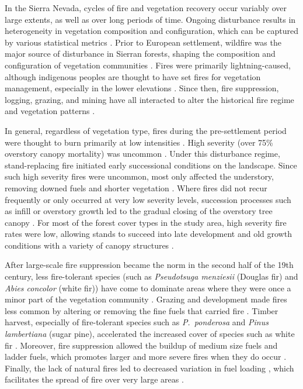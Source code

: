 In the Sierra Nevada, cycles of fire and vegetation recovery occur variably over large extents, as well as over long periods of time. Ongoing disturbance results in heterogeneity in vegetation composition and configuration, which can be captured by various statistical metrics \citep{Monica2008}. Prior to European settlement, wildfire was the major source of disturbance in Sierran forests, shaping the composition and configuration of vegetation communities \citep{SNEP1996a}. Fires were primarily lightning-caused, although indigenous peoples are thought to have set fires for vegetation management, especially in the lower elevations \citep{Anderson1996}. Since then, fire suppression, logging, grazing, and mining have all interacted to alter the historical fire regime and vegetation patterns \citep{Stephens2015,Knapp2013}. 

In general, regardless of vegetation type, fires during the pre-settlement period were thought to burn primarily at low intensities \citep{Skinner1996}. High severity (over 75\% overstory canopy mortality) was uncommon \citep{Mallek2013,Stephens2015}. Under this disturbance regime, stand-replacing fire initiated early successional conditions on the landscape. Since such high severity fires were uncommon, most only affected the understory, removing downed fuels and shorter vegetation \citep{Stephens2015}. Where fires did not recur frequently or only occurred at very low severity levels, succession processes such as infill or overstory growth led to the gradual closing of the overstory tree canopy \citep{SNEP1996a}. For most of the forest cover types in the study area, high severity fire rates were low, allowing stands to succeed into late development and old growth conditions with a variety of canopy structures \citep{Mallek2013,Safford2014}.

After large-scale fire suppression became the norm in the second half of the 19th century, less fire-tolerant species (such as \emph{Pseudotsuga menziesii} (Douglas fir) and \emph{Abies concolor} (white fir)) have come to dominate areas where they were once a minor part of the vegetation community \citep{Stephens2015}. Grazing and development made fires less common by altering or removing the fine fuels that carried fire \citep{Hessburg2005}. Timber harvest, especially of fire-tolerant species such as \emph{P.~ponderosa} and \emph{Pinus lambertiana} (sugar pine), accelerated the increased cover of species such as white fir \citep{Collins2011}. Moreover, fire suppression allowed the buildup of medium size fuels and ladder fuels, which promotes larger and more severe fires when they do occur \citep{Mallek2013}. Finally, the lack of natural fires led to decreased variation in fuel loading , which facilitates the spread of fire over very large areas \citep{Beaty2007,Meyer2008}.

